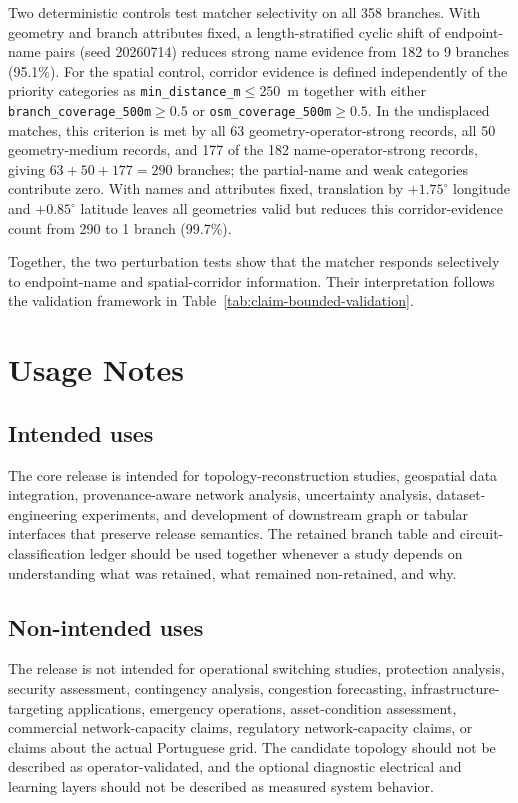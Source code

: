 \documentclass[10pt]{article}
\newcommand{\code}[1]{\texttt{#1}}
\begin{document}
Two deterministic controls test matcher selectivity on all 358 branches. With geometry and branch attributes fixed, a length-stratified cyclic shift of endpoint-name pairs (seed 20260714) reduces strong name evidence from 182 to 9 branches (95.1\%). For the spatial control, corridor evidence is defined independently of the priority categories as \code{min\_distance\_m}$\leq250$~m together with either \code{branch\_coverage\_500m}$\geq0.5$ or \code{osm\_coverage\_500m}$\geq0.5$. In the undisplaced matches, this criterion is met by all 63 geometry-operator-strong records, all 50 geometry-medium records, and 177 of the 182 name-operator-strong records, giving $63+50+177=290$ branches; the partial-name and weak categories contribute zero. With names and attributes fixed, translation by $+1.75^\circ$ longitude and $+0.85^\circ$ latitude leaves all geometries valid but reduces this corridor-evidence count from 290 to 1 branch (99.7\%).

Together, the two perturbation tests show that the matcher responds selectively to endpoint-name and spatial-corridor information. Their interpretation follows the validation framework in Table~\ref{tab:claim-bounded-validation}.

\FloatBarrier
\section{Usage Notes}

\subsection{Intended uses}

The core release is intended for topology-reconstruction studies, geospatial data integration, provenance-aware network analysis, uncertainty analysis, dataset-engineering experiments, and development of downstream graph or tabular interfaces that preserve release semantics. The retained branch table and circuit-classification ledger should be used together whenever a study depends on understanding what was retained, what remained non-retained, and why.

\subsection{Non-intended uses}

The release is not intended for operational switching studies, protection analysis, security assessment, contingency analysis, congestion forecasting, infrastructure-targeting applications, emergency operations, asset-condition assessment, commercial network-capacity claims, regulatory network-capacity claims, or claims about the actual Portuguese grid. The candidate topology should not be described as operator-validated, and the optional diagnostic electrical and learning layers should not be described as measured system behavior.
\end{document}
